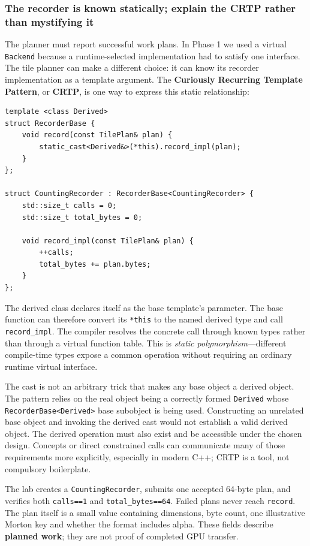 \subsubsection{The recorder is known statically; explain the CRTP rather than mystifying it}\label{the-recorder-is-known-statically-explain-the-crtp-rather-than-mystifying-it}

The planner must report successful work plans. In Phase 1 we used a virtual \texttt{Backend} because a runtime-selected implementation had to satisfy one interface. The tile planner can make a different choice: it can know its recorder implementation as a template argument. The \textbf{Curiously Recurring Template Pattern}, or \textbf{CRTP}, is one way to express this static relationship:

\begin{verbatim}
template <class Derived>
struct RecorderBase {
    void record(const TilePlan& plan) {
        static_cast<Derived&>(*this).record_impl(plan);
    }
};

struct CountingRecorder : RecorderBase<CountingRecorder> {
    std::size_t calls = 0;
    std::size_t total_bytes = 0;

    void record_impl(const TilePlan& plan) {
        ++calls;
        total_bytes += plan.bytes;
    }
};
\end{verbatim}

The derived class declares itself as the base template's parameter. The base function can therefore convert its \texttt{*this} to the named derived type and call \texttt{record\_impl}. The compiler resolves the concrete call through known types rather than through a virtual function table. This is \emph{static polymorphism}---different compile-time types expose a common operation without requiring an ordinary runtime virtual interface.

The cast is not an arbitrary trick that makes any base object a derived object. The pattern relies on the real object being a correctly formed \texttt{Derived} whose \texttt{RecorderBase\textless{}Derived\textgreater{}} base subobject is being used. Constructing an unrelated base object and invoking the derived cast would not establish a valid derived object. The derived operation must also exist and be accessible under the chosen design. Concepts or direct constrained calls can communicate many of those requirements more explicitly, especially in modern C++; CRTP is a tool, not compulsory boilerplate.

The lab creates a \texttt{CountingRecorder}, submits one accepted 64-byte plan, and verifies both \texttt{calls==1} and \texttt{total\_bytes==64}. Failed plans never reach \texttt{record}. The plan itself is a small value containing dimensions, byte count, one illustrative Morton key and whether the format includes alpha. These fields describe \textbf{planned work}; they are not proof of completed GPU transfer.

